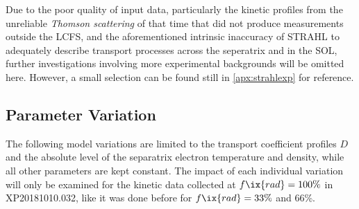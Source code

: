 %
            \newline%
            Due to the poor quality of input data, particularly the kinetic profiles from the unreliable \textit{Thomson scattering} of that time that did not produce measurements outside the LCFS, and the aforementioned intrinsic inaccuracy of STRAHL to adequately describe transport processes across the seperatrix and in the SOL, further investigations involving more experimental backgrounds will be omitted here. However, a small selection can be found still in \cref{apx:strahlexp} for reference.%
%
        \subsection{Parameter Variation}\label{subsec:parametervar}%
%
            The following model variations are limited to the transport coefficient profiles $D$ and the absolute level of the separatrix electron temperature and density, while all other parameters are kept constant. The impact of each individual variation will only be examined for the kinetic data collected at $f\ix{rad}=100\%$ in XP20181010.032, like it was done before for $f\ix{rad}=33\%$ and 66\%.%
%
